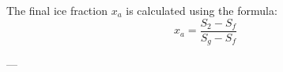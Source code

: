 The final ice fraction \( x_a \) is calculated using the formula:  
\[
x_a = \frac{S_2 - S_f}{S_g - S_f}
\]

---